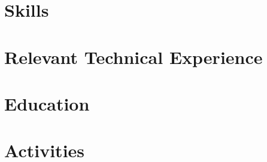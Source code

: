 \documentclass[letter,10pt]{article}
\begin{document}


\section{Skills}


\section{Relevant Technical Experience}


\section{Education}



\section{Activities}

\end{document}
